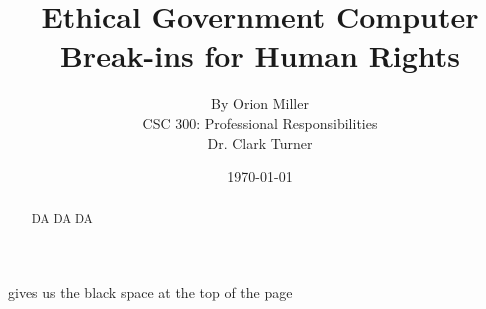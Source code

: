 \documentclass[11pt]{article}
\begin{document}
\title{\vfill Ethical Government Computer Break-ins for Human Rights} %
gives us the black space at the top of the page \author{ By Orion
Miller\vspace{10pt} \\ CSC 300: Professional Responsibilities\vspace{10pt} \\
Dr. Clark Turner\vspace{10pt} \\ }
\date{\today}

\maketitle

\vfill  %
\begin{abstract} DA DA DA\end{abstract}

\thispagestyle{empty} %

\newpage



\thispagestyle{empty}  %

\tableofcontents

\newpage

\end{document}
